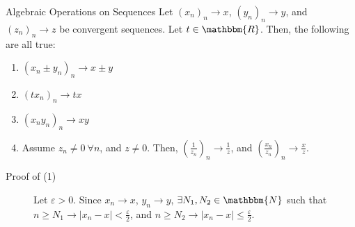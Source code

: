 \documentclass[10pt]{extarticle}
\newcommand{\N}{\mathbbm{N}}
\newcommand{\R}{\mathbbm{R}}
\begin{document}
  \begin{problem}{Algebraic Operations on Sequences}
    Let $(x_n)_n\rightarrow x$, $(y_n)_n\rightarrow y$, and $(z_n)_n\rightarrow z$ be convergent sequences. Let $t\in\R$. Then, the following are all true:
    \begin{enumerate}[(1)]
      \item $(x_n \pm y_n)_n \rightarrow x\pm y$
      \item $(tx_n)_n \rightarrow tx$
      \item $(x_ny_n)_n \rightarrow xy$
      \item Assume $z_n \neq 0~\forall n$, and $z\neq 0$. Then, $\left(\frac{1}{z_n}\right)_n \rightarrow \frac{1}{z}$, and $\left(\frac{x_n}{z_n}\right)_n \rightarrow \frac{x}{z}$.
    \end{enumerate}
    \tcblower
    \begin{description}
        \item[Proof of (1)] Let $\varepsilon > 0$. Since $x_n \rightarrow x$, $y_n \rightarrow y$, $\exists N_1,N_2\in \N$ such that $n\geq N_1 \rightarrow |x_n - x| < \frac{\varepsilon}{2}$, and $n\geq N_2 \rightarrow |x_n - x| \leq \frac{\varepsilon}{2}$.\\


\end{description}
\end{problem}
\end{document}

